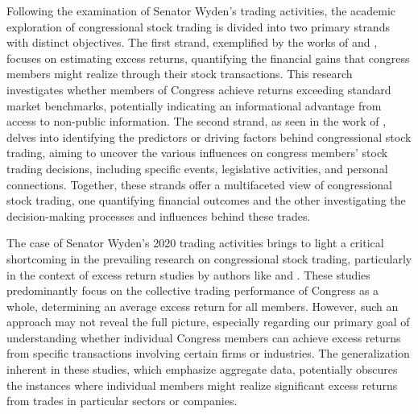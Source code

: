 \documentclass[15pt,letterpaper]{article}
\begin{document}
Following the examination of Senator Wyden's trading activities, the academic exploration of congressional stock trading is divided into two primary strands with distinct objectives. The first strand, exemplified by the works of \cite{zi24, zi11} and \cite{eg13}, focuses on estimating excess returns, quantifying the financial gains that congress members might realize through their stock transactions. This research investigates whether members of Congress achieve returns exceeding standard market benchmarks, potentially indicating an informational advantage from access to non-public information. The second strand, as seen in the work of \cite{eg14}, delves into identifying the predictors or driving factors behind congressional stock trading, aiming to uncover the various influences on congress members’ stock trading decisions, including specific events, legislative activities, and personal connections. Together, these strands offer a multifaceted view of congressional stock trading, one quantifying financial outcomes and the other investigating the decision-making processes and influences behind these trades.

The case of Senator Wyden's 2020 trading activities brings to light a critical shortcoming in the prevailing research on congressional stock trading, particularly in the context of excess return studies by authors like \cite{zi24,zi11} and \cite{eg13}. These studies predominantly focus on the collective trading performance of Congress as a whole, determining an average excess return for all members. However, such an approach may not reveal the full picture, especially regarding our primary goal of understanding whether individual Congress members can achieve excess returns from specific transactions involving certain firms or industries. The generalization inherent in these studies, which emphasize aggregate data, potentially obscures the instances where individual members might realize significant excess returns from trades in particular sectors or companies.
\end{document}
